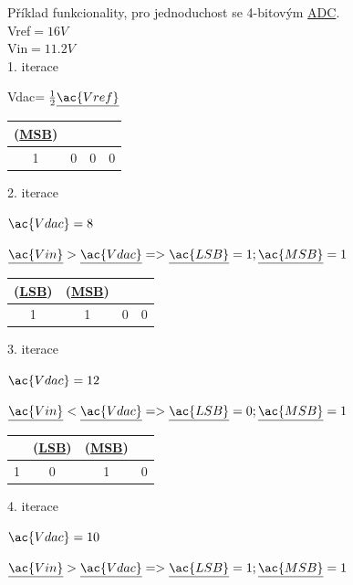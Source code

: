 \documentclass[czech,12pt,a4paper]{article}
\begin{document}
\vspace*{1cm}
\noindent Příklad funkcionality, pro jednoduchost se 4-bitovým \underline{\ac{ADC}}. \\

\noindent\ac{Vref}$ = 16V$ \\
\noindent\ac{Vin}$ = 11.2V$ \\

1. iterace

\ac{Vdac}$ = \frac{1}{2} \underline{\ac{Vref}}$

\begin{center}
	\begin{tabular}{ |c|c|c|c| } 
		\hline
		(\underline{\ac{MSB}}) & & & \\ 
		\hline
		1 & 0 & 0 & 0 \\ 
		\hline
	\end{tabular}
\end{center}

2. iterace

	$\ac{Vdac} = 8$

	$\underline{\ac{Vin}} > \underline{\ac{Vdac}} => \underline{\ac{LSB}} = 1; \underline{\ac{MSB}} = 1$

\begin{center}
	\begin{tabular}{ |c|c|c|c| } 
		\hline
		(\underline{\ac{LSB}}) & (\underline{\ac{MSB}}) & & \\ 
		\hline
		1 & 1 & 0 & 0 \\ 
		\hline
	\end{tabular}
\end{center}

3. iterace

	$\ac{Vdac} = 12$

	$\underline{\ac{Vin}} < \underline{\ac{Vdac}} => \underline{\ac{LSB}} = 0; \underline{\ac{MSB}} = 1$

\begin{center}
	\begin{tabular}{ |c|c|c|c| } 
		\hline
		& (\underline{\ac{LSB}}) & (\underline{\ac{MSB}}) & \\ 
		\hline
		1 & 0 & 1 & 0 \\ 
		\hline
	\end{tabular}
\end{center}

4. iterace

$\ac{Vdac} = 10$

	$\underline{\ac{Vin}} > \underline{\ac{Vdac}} => \underline{\ac{LSB}} = 1; \underline{\ac{MSB}} = 1$
\end{document}
